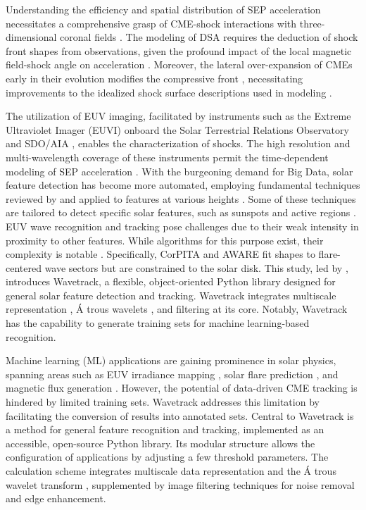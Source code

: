 Understanding the efficiency and spatial distribution of SEP acceleration necessitates a comprehensive grasp of CME-shock interactions with three-dimensional coronal fields \cite{rouillard_2016}. The modeling of DSA requires the deduction of shock front shapes from observations, given the profound impact of the local magnetic field-shock angle on acceleration \cite{guo_2013}. Moreover, the lateral over-expansion of CMEs early in their evolution modifies the compressive front \cite{bein_2011, temmer_2016}, necessitating improvements to the idealized shock surface descriptions used in modeling \citep{vourlidas_2012, kwon_2014, rouillard_2016}.

The utilization of EUV imaging, facilitated by instruments such as the Extreme Ultraviolet Imager (EUVI) onboard the Solar Terrestrial Relations Observatory \citep[STEREO]{wuelser_2004} and SDO/AIA \citep{lemen_2012}, enables the characterization of shocks. The high resolution and multi-wavelength coverage of these instruments permit the time-dependent modeling of SEP acceleration \citep{kozarev_2016, kozarev_2017, kozarev_2019}. With the burgeoning demand for Big Data, solar feature detection has become more automated, employing fundamental techniques reviewed by \citet{aschwanden_2010} and applied to features at various heights \citep{perez_Suarez_2011}. Some of these techniques are tailored to detect specific solar features, such as sunspots and active regions \citep{curto_2008}.
EUV wave recognition and tracking pose challenges due to their weak intensity in proximity to other features. While algorithms for this purpose exist, their complexity is notable \citep{podladchikova_2005, verbeeck_2014, long_2014, ireland_2019}. Specifically, CorPITA \citep{long_2014} and AWARE \citep{ireland_2019} fit shapes to flare-centered wave sectors but are constrained to the solar disk.
This study, led by \citet{stepanyuk_2022}, introduces Wavetrack, a flexible, object-oriented Python library designed for general solar feature detection and tracking. Wavetrack integrates multiscale representation \citep{starck_2002}, \'A trous wavelets \citep{akansu_1991, holschneider_1989}, and filtering at its core. Notably, Wavetrack has the capability to generate training sets for machine learning-based recognition.

Machine learning (ML) applications are gaining prominence in solar physics, spanning areas such as EUV irradiance mapping \citep{szenicer_2019}, solar flare prediction \citep{li_2013}, and magnetic flux generation \citep{kim_2019}. However, the potential of data-driven CME tracking is hindered by limited training sets. Wavetrack addresses this limitation by facilitating the conversion of results into annotated sets.
Central to Wavetrack is a method for general feature recognition and tracking, implemented as an accessible, open-source Python library. Its modular structure allows the configuration of applications by adjusting a few threshold parameters. The calculation scheme integrates multiscale data representation \citep{starck_2002} and the \'A trous wavelet transform \citep{akansu_1991, holschneider_1989}, supplemented by image filtering techniques for noise removal and edge enhancement.

